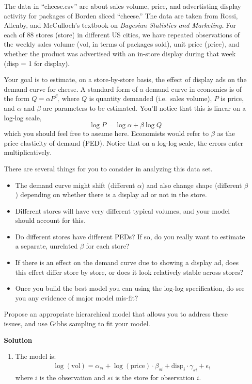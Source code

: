\documentclass{article}
\begin{document}
The data in ``cheese.csv'' are about sales volume, price, and advertisting display activity for packages of Borden sliced ``cheese.'' The data are taken from Rossi, Allenby, and McCulloch's textbook on \textit{Bayesian Statistics and Marketing.} For each of 88 stores (store) in different US cities, we have repeated observations of the weekly sales volume (vol, in terms of packages sold), unit price (price), and whether the product was advertised with an in-store display during that week (disp = 1 for display).

Your goal is to estimate, on a store-by-store basis, the effect of display ads on the demand curve for cheese.  A standard form of a demand curve in economics is of the form $Q = \alpha P^\beta$, where $Q$ is quantity demanded (i.e.~sales volume), $P$ is price, and $\alpha$ and $\beta$ are parameters to be estimated.  You'll notice that this is linear on a log-log scale,
$$
\log P = \log \alpha + \beta \log Q \,
$$
which you should feel free to assume here.  Economists would refer to $\beta$ as the price elasticity of demand (PED).  Notice that on a log-log scale, the errors enter multiplicatively.

There are several things for you to consider in analyzing this data set.
\begin{itemize}
\item The demand curve might shift (different $\alpha$) and also change shape (different $\beta$) depending on whether there is a display ad or not in the store.
\item Different stores will have very different typical volumes, and your model should account for this.
\item Do different stores have different PEDs?  If so, do you really want to estimate a separate, unrelated $\beta$ for each store?
\item If there is an effect on the demand curve due to showing a display ad, does this effect differ store by store, or does it look relatively stable across stores?
\item Once you build the best model you can using the log-log specification, do see you any evidence of major model mis-fit?
\end{itemize}
Propose an appropriate hierarchical model that allows you to address these issues, and use Gibbs sampling to fit your model.

\textbf{Solution}
\begin{enumerate}
\item The model is:
\begin{align*}
\log (\mbox{vol}) = \alpha_{si} + \log (\mbox{price}) \cdot \beta_{si} + \mbox{disp}_i  \cdot \gamma_{si} + \epsilon_i 
\end{align*}
where \(i\) is the observation and \(si\) is the store for observation \(i\).
\end{enumerate}
\end{document}
